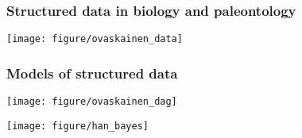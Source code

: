\documentclass{beamer}
\begin{document}
\begin{frame}
  \frametitle{Structured data in biology and paleontology}

  \begin{center}
    \texttt{[image: figure/ovaskainen\_data]}
  \end{center}

  \tiny{}
\end{frame}

\begin{frame}
  \frametitle{Models of structured data}

  \begin{center}
    \texttt{[image: figure/ovaskainen\_dag]}
  \end{center}

  \tiny{}
\end{frame}

\begin{frame}
  \begin{center}
    \texttt{[image: figure/han\_bayes]}
  \end{center}

  \tiny{}
\end{frame}
\end{document}
